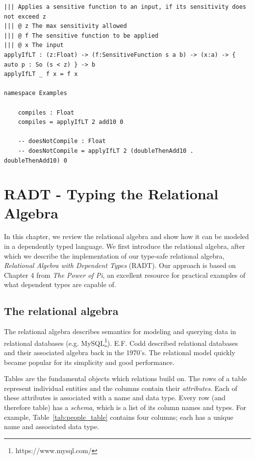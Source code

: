 \documentclass[12pt]{report}
\begin{document}
\begin{lstlisting}[float,caption={Sensitivity-aware function application},label={lst:sens_app}]
||| Applies a sensitive function to an input, if its sensitivity does not exceed z
||| @ z The max sensitivity allowed
||| @ f The sensitive function to be applied
||| @ x The input
applyIfLT : (z:Float) -> (f:SensitiveFunction s a b) -> (x:a) -> { auto p : So (s < z) } -> b
applyIfLT _ f x = f x

namespace Examples

    compiles : Float
    compiles = applyIfLT 2 add10 0

    -- doesNotCompile : Float
    -- doesNotCompile = applyIfLT 2 (doubleThenAdd10 . doubleThenAdd10) 0
\end{lstlisting}

\chapter{RADT - Typing the Relational Algebra}\label{sec:RADT}

In this chapter, we review the relational algebra and show how it can be modeled in a dependently typed language.
We first introduce the relational algebra, after which we describe the implementation of our type-safe relational algebra, \textit{Relational Algebra with Dependent Types} (RADT).
Our approach is based on Chapter 4 from \textit{The Power of Pi}\cite{OurySwierstra08PowerOfPi}, an excellent resource for practical examples of what dependent types are capable of.

\section{The relational algebra}

The relational algebra describes semantics for modeling and querying data in relational databases (e.g. MySQL\footnote{https://www.mysql.com/}).
E.F. Codd described relational databases and their associated algebra back in the 1970's\cite{codd70}.
The relational model quickly became popular for its simplicity and good performance.

Tables are the fundamental objects which relations build on.
The rows of a table represent individual entities and the columns contain their \textit{attributes}.
Each of these attributes is associated with a name and data type.
Every row (and therefore table) has a \textit{schema}, which is a list of its column names and types.
For example, Table~\ref{tab:people_table} contains four columns; each has a unique name and associated data type.
\end{document}
